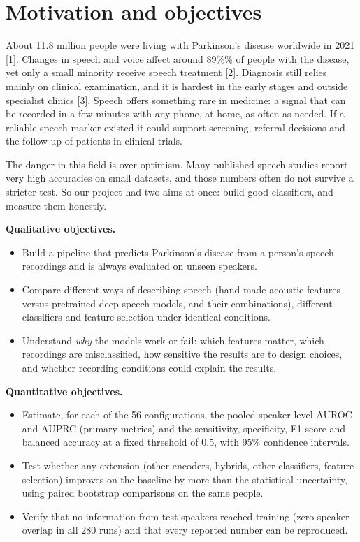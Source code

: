 \documentclass[11pt,a4paper]{article}
\begin{document}
\section{Motivation and objectives}\label{sec:motivation}
About 11.8 million people were living with Parkinson's disease worldwide in 2021 [1]. Changes in speech and voice affect around 89\%\% of people with the disease, yet only a small minority receive speech treatment [2]. Diagnosis still relies mainly on clinical examination, and it is hardest in the early stages and outside specialist clinics [3]. Speech offers something rare in medicine: a signal that can be recorded in a few minutes with any phone, at home, as often as needed. If a reliable speech marker existed it could support screening, referral decisions and the follow-up of patients in clinical trials.

The danger in this field is over-optimism. Many published speech studies report very high accuracies on small datasets, and those numbers often do not survive a stricter test. So our project had two aims at once: build good classifiers, and measure them honestly.

\textbf{Qualitative objectives.}

\begin{itemize}\item Build a pipeline that predicts Parkinson's disease from a person's speech recordings and is always evaluated on unseen speakers.
\item Compare different ways of describing speech (hand-made acoustic features versus pretrained deep speech models, and their combinations), different classifiers and feature selection under identical conditions.
\item Understand \emph{why} the models work or fail: which features matter, which recordings are misclassified, how sensitive the results are to design choices, and whether recording conditions could explain the results.
\end{itemize}
\textbf{Quantitative objectives.}

\begin{itemize}\item Estimate, for each of the 56 configurations, the pooled speaker-level AUROC and AUPRC (primary metrics) and the sensitivity, specificity, F1 score and balanced accuracy at a fixed threshold of 0.5, with 95\% confidence intervals.
\item Test whether any extension (other encoders, hybrids, other classifiers, feature selection) improves on the baseline by more than the statistical uncertainty, using paired bootstrap comparisons on the same people.
\item Verify that no information from test speakers reached training (zero speaker overlap in all 280 runs) and that every reported number can be reproduced.
\end{itemize}
\end{document}
